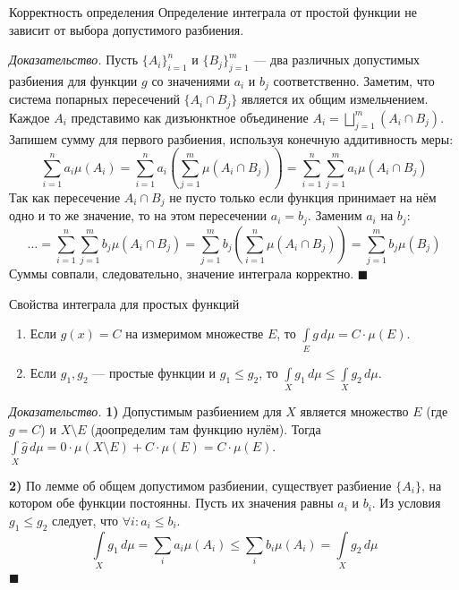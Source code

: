 \documentclass[12pt,a4paper]{article}
\newenvironment{Proof}[1][Доказательство]{\vspace{0.5em}\noindent\textit{#1.}\hspace{0.5em}\ignorespaces}{\hfill$\blacksquare$\vspace{1em}}
\begin{document}
\begin{Lemma}{Корректность определения}{}
Определение интеграла от простой функции не зависит от выбора допустимого разбиения.
\end{Lemma}

\begin{Proof}
Пусть $\{A_i\}_{i=1}^n$ и $\{B_j\}_{j=1}^m$ — два различных допустимых разбиения для функции $g$ со значениями $a_i$ и $b_j$ соответственно.
Заметим, что система попарных пересечений $\{A_i \cap B_j\}$ является их общим измельчением. Каждое $A_i$ представимо как дизъюнктное объединение $A_i = \bigsqcup\limits_{j=1}^m (A_i \cap B_j)$.
Запишем сумму для первого разбиения, используя конечную аддитивность меры:
$$ \sum\limits_{i=1}^n a_i \mu(A_i) = \sum\limits_{i=1}^n a_i \left( \sum\limits_{j=1}^m \mu(A_i \cap B_j) \right) = \sum\limits_{i=1}^n \sum\limits_{j=1}^m a_i \mu(A_i \cap B_j) $$
Так как пересечение $A_i \cap B_j$ не пусто только если функция принимает на нём одно и то же значение, то на этом пересечении $a_i = b_j$. Заменим $a_i$ на $b_j$:
$$ \dots = \sum\limits_{i=1}^n \sum\limits_{j=1}^m b_j \mu(A_i \cap B_j) = \sum\limits_{j=1}^m b_j \left( \sum\limits_{i=1}^n \mu(A_i \cap B_j) \right) = \sum\limits_{j=1}^m b_j \mu(B_j) $$
Суммы совпали, следовательно, значение интеграла корректно.
\end{Proof}

\begin{Lemma}{Свойства интеграла для простых функций}{}
\begin{enumerate}
    \item Если $g(x) = C$ на измеримом множестве $E$, то $\int\limits_E g \, d\mu = C \cdot \mu(E)$.
    \item Если $g_1, g_2$ — простые функции и $g_1 \le g_2$, то $\int\limits_X g_1 \, d\mu \le \int\limits_X g_2 \, d\mu$.
\end{enumerate}
\end{Lemma}

\begin{Proof}
\textbf{1)} Допустимым разбиением для $X$ является множество $E$ (где $g=C$) и $X \setminus E$ (доопределим там функцию нулём). 
Тогда $\int\limits_X \hat{g} \, d\mu = 0 \cdot \mu(X \setminus E) + C \cdot \mu(E) = C \cdot \mu(E)$.

\textbf{2)} По лемме об общем допустимом разбиении, существует разбиение $\{A_i\}$, на котором обе функции постоянны. Пусть их значения равны $a_i$ и $b_i$. Из условия $g_1 \le g_2$ следует, что $\forall i: a_i \le b_i$.
$$ \int\limits_X g_1 \, d\mu = \sum\limits_{i} a_i \mu(A_i) \le \sum\limits_{i} b_i \mu(A_i) = \int\limits_X g_2 \, d\mu $$
\end{Proof}
\end{document}
